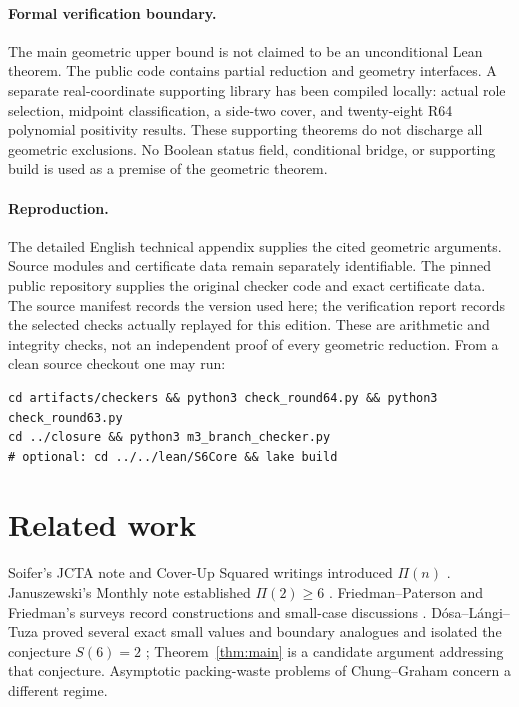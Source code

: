 \documentclass[11pt,reqno]{amsart}
\theoremstyle{definition}
\begin{document}
\paragraph{Formal verification boundary.}
The main geometric upper bound is not claimed to be an unconditional Lean
theorem. The public code contains partial reduction and geometry interfaces.
A separate real-coordinate supporting library has been compiled locally:
actual role selection, midpoint classification, a side-two cover, and twenty-eight
R64 polynomial positivity results. These supporting theorems do not discharge
all geometric exclusions. No Boolean status field, conditional bridge, or
supporting build is used as a premise of the geometric theorem.

\paragraph{Reproduction.}
The detailed English technical appendix supplies the cited geometric arguments. Source modules and certificate data remain separately identifiable.
The pinned public repository supplies the original checker code and exact
certificate data. The source manifest records the version used here; the
verification report records the selected checks actually replayed for this
edition. These are arithmetic and integrity checks, not an independent proof
of every geometric reduction. From a clean source checkout one may run:
\begin{verbatim}
cd artifacts/checkers && python3 check_round64.py && python3 check_round63.py
cd ../closure && python3 m3_branch_checker.py
# optional: cd ../../lean/S6Core && lake build
\end{verbatim}

\section{Related work}\label{sec:related}

Soifer's JCTA note and Cover-Up Squared writings introduced $\Pi(n)$
\cite{Soifer2006,SoiferCoverUp}.
Januszewski's Monthly note established $\Pi(2)\ge 6$ \cite{Januszewski2009}.
Friedman--Paterson and Friedman's surveys record constructions and small-case
discussions \cite{FriedmanPaterson2006,FriedmanCovering}.
D\'osa--L\'angi--Tuza proved several exact small values and boundary analogues
and isolated the conjecture $S(6)=2$ \cite{DLT2026}; Theorem~\ref{thm:main}
is a candidate argument addressing that conjecture.
Asymptotic packing-waste problems of Chung--Graham
\cite{ChungGraham2009,ChungGraham2020} concern a different regime.
\end{document}

